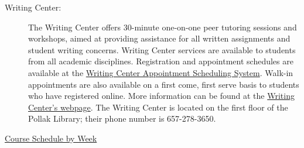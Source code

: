 \documentclass[11pt]{article}
\begin{document}
\begin{description}
\begin{description}
		\item[Writing Center:] The Writing Center offers 30-minute one-on-one peer tutoring sessions and workshops, aimed at providing assistance for all written assignments and student writing concerns. Writing Center services are available to students from all academic disciplines. Registration and appointment schedules are available at the \href{http://fullerton.mywconline.com/}{Writing Center Appointment Scheduling System}. Walk-in appointments are also available on a first come, first serve basis to students who have registered online. More information can be found at the \href{http://www.fullerton.edu/learningassistance/tutoring_centers/writing.asp}{Writing Center's webpage}. The Writing Center is located on the first floor of the Pollak Library; their phone number is 657-278-3650.
\end{description}

\begin{large}
	\item \underline{Course Schedule by Week}
\end{large}
\end{description}
\end{document}
